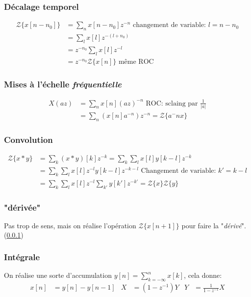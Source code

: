 \documentclass{report}
\begin{document}
\subsubsection{Décalage temporel} \label{Ztemp}
\begin{align*}
\mathcal{Z}\{x[n -n_0]\} &= \sum_n x[n-n_0]z^{-n} \text{ changement de variable: } l = n - n_0\\
&= \sum_l x[l]z^{-(l+n_0)}\\
&= z^{-n_0} \sum_l x[l]z^{-l}\\
&= z^{-n_0} \mathcal{Z}\{x[n]\} \text{ même ROC}
\end{align*}

\subsubsection{Mises à l'échelle \textit{fréquentielle}}
\begin{align*}
X(az) &= \sum_n x[n](az)^{-n} \text{  ROC: sclaing par } \frac{1}{|a|}\\
&= \sum_n (x[n] a^{-n}) z^{-n} = \mathcal{Z}\{a{^-n}x\}
\end{align*}

\subsubsection{Convolution}
\begin{align*}
\mathcal{Z}\{x \ast y \} &= \sum_k ( x \ast y)[k] z^{-k} = \sum_k \sum_l x[l] y[k-l]z^{-k}\\
&= \sum_k \sum_l x[l]z^{-l} y[k-l]z^{-k-l} \text{ Changement de variable: } k' = k-l\\
&= \sum_k \sum_l x[l]z^{-l} \sum_{k'} y[k']z^{-k'} = \mathcal{Z}\{x\} \mathcal{Z}\{y\}
\end{align*}

\subsubsection{"dérivée"}
Pas trop de sens, mais on réalise l'opération $\mathcal{Z}\{x[n+1]\}$ pour faire la "\textit{dérivé}". (\ref{Ztemp})

\subsubsection{Intégrale}
On réalise une sorte d'accumulation $y[n] = \sum_{k=-\infty}^n x[k]$, cela donne:
\begin{align*}
x[n] &= y[n] - y[n-1] & X &= (1- z^{-1})Y & Y &= \frac{1}{1 -z^{-1}} X 
\end{align*}
\end{document}
